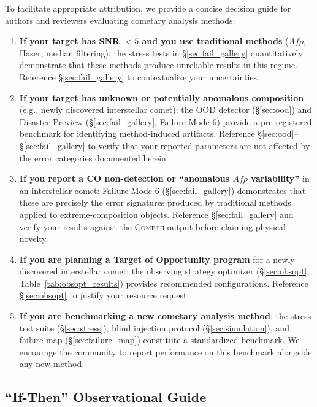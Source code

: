 \documentclass[usenatbib]{mnras}
\begin{document}
To facilitate appropriate attribution, we provide a concise decision guide for authors and reviewers evaluating cometary analysis methods:

\begin{enumerate}
    \item \textbf{If your target has SNR $<5$ and you use traditional methods} ($Af\rho$, Haser, median filtering): the stress tests in \S\ref{sec:fail_gallery} quantitatively demonstrate that these methods produce unreliable results in this regime. Reference \S\ref{sec:fail_gallery} to contextualize your uncertainties.
    \item \textbf{If your target has unknown or potentially anomalous composition} (e.g., newly discovered interstellar comet): the OOD detector (\S\ref{sec:ood}) and Disaster Preview (\S\ref{sec:fail_gallery}, Failure Mode 6) provide a pre-registered benchmark for identifying method-induced artifacts. Reference \S\ref{sec:ood}--\S\ref{sec:fail_gallery} to verify that your reported parameters are not affected by the error categories documented herein.
    \item \textbf{If you report a CO non-detection or ``anomalous $Af\rho$ variability''} in an interstellar comet: Failure Mode 6 (\S\ref{sec:fail_gallery}) demonstrates that these are precisely the error signatures produced by traditional methods applied to extreme-composition objects. Reference \S\ref{sec:fail_gallery} and verify your results against the \textsc{Cometh} output before claiming physical novelty.
    \item \textbf{If you are planning a Target of Opportunity program} for a newly discovered interstellar comet: the observing strategy optimizer (\S\ref{sec:obsopt}, Table~\ref{tab:obsopt_results}) provides recommended configurations. Reference \S\ref{sec:obsopt} to justify your resource request.
    \item \textbf{If you are benchmarking a new cometary analysis method}: the stress test suite (\S\ref{sec:stress}), blind injection protocol (\S\ref{sec:simulation}), and failure map (\S\ref{sec:failure_map}) constitute a standardized benchmark. We encourage the community to report performance on this benchmark alongside any new method.
\end{enumerate}

\subsection{``If-Then'' Observational Guide}\label{sec:ifthen}
\end{document}
